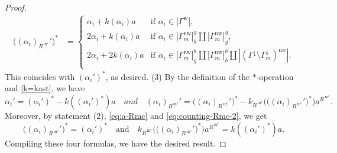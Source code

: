 \documentclass[11pt]{amsart}
\newcommand{\mc}{\, \underline{\mathrm{m}}^c}
\newcommand{\w}{\mathrm{w}}
\newcommand{\nw}{\mathrm{nw}}
\begin{document}
{\begin{proof}
\begin{align*}
\big((\alpha_i)_{R^{\mc}}'\big)^*
&=
\begin{cases}
\alpha_i+k(\alpha_i)a & \text{if $\alpha_i\in |\Gamma^\w|$},\\
2\alpha_i+k(\alpha_i)a & \text{if $\alpha_i\in 
|\Gamma_m^\nw|_b^g\amalg |\Gamma_m^\nw|_g^g$},\\
2\alpha_i+2k(\alpha_i)a & \text{if $\alpha_i\in 
|\Gamma_m^\nw|_g^b\amalg |\Gamma_m^\nw|_b^b \amalg
|(\Gamma^{\downarrow}\setminus \Gamma_m^{\downarrow})^\nw|$}.\\
\end{cases}
\end{align*}
This coincides with $(\alpha_i')^\ast$, as desired.
\vskip 1mm
\noindent
(3) 
By the definition of the $\ast$-operation and \eqref{k=kast}, we have
\[\alpha_i'=(\alpha_i')^\ast-k((\alpha_i')^\ast)a\quad{and}\quad
(\alpha_i)_{R^{\mc}}'
=\big((\alpha_i)_{R^{\mc}}'\big)^\ast
-k_{R^{\mc}}\big(\big((\alpha_i)_{R^{\mc}}'\big)^\ast\big)a^{R^{\mc}}.\]
Moreover, by statement (2), \eqref{eq:a-Rmc} and 
\eqref{eq:counting-Rmc-2}, we get 
\[\big((\alpha_i)_{R^{\mc}}'\big)^\ast=(\alpha_i')^\ast\quad\text{and}\quad
k_{R^{\mc}}\big(\big((\alpha_i)_{R^{\mc}}'\big)^\ast\big)a^{R^{\mc}}
=k((\alpha_i')^\ast)a.\]
Compiling these four formulas, we have the desired result.
 \end{proof}

}
\end{document}
